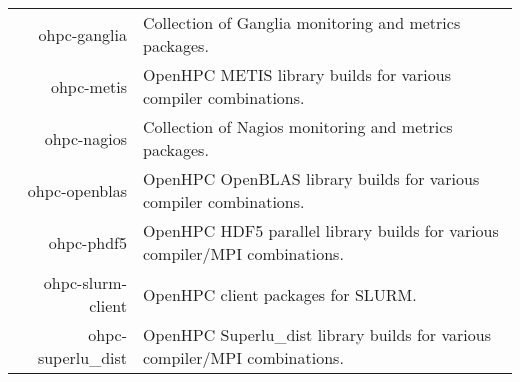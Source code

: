 \begin{tabularx}{\textwidth}{r|X}
ohpc-ganglia & Collection of Ganglia monitoring and metrics packages. \\ 
ohpc-metis & OpenHPC METIS library builds for various compiler combinations. \\ 
ohpc-nagios & Collection of Nagios monitoring and metrics packages. \\ 
ohpc-openblas & OpenHPC OpenBLAS library builds for various compiler combinations. \\ 
ohpc-phdf5 & OpenHPC HDF5 parallel library builds for various compiler/MPI combinations. \\ 
ohpc-slurm-client & OpenHPC client packages for SLURM. \\ 
ohpc-superlu\_dist & OpenHPC Superlu\_dist library builds for various compiler/MPI combinations. \\ 
\bottomrule
\end{tabularx}
